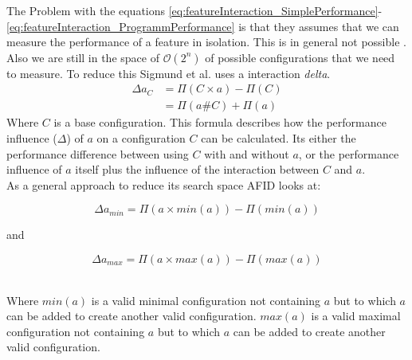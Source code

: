 The Problem with the equations \ref{eq:featureInteraction_SimplePerformance}-\ref{eq:featureInteraction_ProgrammPerformance} is that they assumes that we can measure the performance of a feature in isolation. This is in general not possible \cite{AutomatedFeatureDetectionSiegmund2012}. Also we are still in the space of $\mathcal{O}(2^n)$ of possible configurations that we need to measure.  
To reduce this Sigmund et al. uses a interaction \textit{delta}. 
\begin{equation}
\begin{split}
\Delta a_C &= \Pi(C\times a) - \Pi(C)\\
&=\Pi(a\# C) + \Pi(a)
\end{split}
\end{equation}
Where $C$ is a base configuration. This formula describes how the performance influence ($\Delta$) of $a$ on a configuration $C$ can be calculated. Its either the performance difference between using $C$ with and without $a$, or the performance influence of $a$ itself plus the influence of the interaction between $C$ and $a$.\\
As a general approach to reduce its search space AFID looks at:\\
\begin{minipage}{\textwidth}
\begin{equation}
	\Delta a_{min} = \Pi(a \times min(a)) - \Pi(min(a))
\end{equation}
\begin{center}
	and
\end{center}
\begin{equation}
	\Delta a_{max} = \Pi(a \times max(a)) - \Pi(max(a))
\end{equation}
\end{minipage}\\[0.3cm]
 Where $min(a)$ is a valid minimal configuration not containing $a$ but to which $a$ can be added to create another valid configuration. $max(a)$ is a valid maximal configuration not containing $a$ but to which $a$ can be added to create another valid configuration.\\
